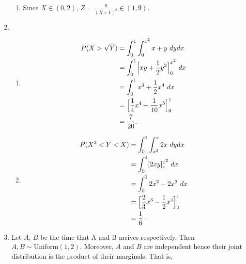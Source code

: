 \documentclass{article}
\begin{document}
\begin{enumerate}
\begin{enumerate}
        \item Since $X \in (0, 2)$, $Z = \frac{9}{(X + 1)^2} \in (1, 9)$.
    \end{enumerate}

    \item \begin{enumerate}
        \item \begin{align*}
            P(X > \sqrt{Y})
            &= \int_{0}^{1} \int_{0}^{x^2} x + y \ dydx \\
            &= \int_{0}^{1} \Bigl[ xy + \frac{1}{2}y^2 \Bigr]_0^{x^2} \ dx \\
            &= \int_{0}^{1} x^3 + \frac{1}{2}x^4 \ dx \\
            &= \Bigl[ \frac{1}{4}x^4 + \frac{1}{10}x^5 \Bigr]_0^1 \\
            &= \frac{7}{20}.
        \end{align*}

        \item \begin{align*}
            P(X^2 < Y < X) 
            &= \int_{0}^{1} \int_{x^2}^{x} 2x \ dydx \\
            &= \int_{0}^{1} [2xy]_x^{x^2} \ dx \\
            &= \int_{0}^{1} 2x^2 - 2x^3 \ dx \\
            &= \Bigl[ \frac{2}{3}x^3 - \frac{1}{2}x^4 \Bigr]_0^1 \\
            &= \frac{1}{6}.
        \end{align*}
    \end{enumerate}

    \item Let $A$, $B$ be the time that A and B arrives respectively. Then $A, B \sim \text{Uniform}(1, 2)$.
    Moreover, $A$ and $B$ are independent hence their joint distribution is the product of their marginals. 
    That is, 

\end{enumerate}
\end{document}
